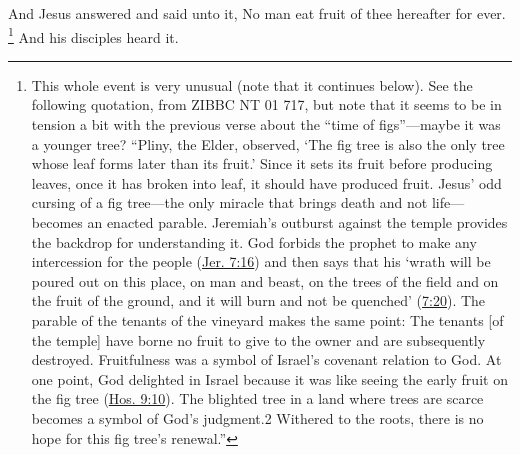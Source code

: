 			And Jesus answered and said unto it, No man eat fruit of thee hereafter for ever.%
				\footnote{%
					This whole event is very unusual (note that it continues below). See the following quotation, from ZIBBC NT 01 717, but note that it seems to be in tension a bit with the previous verse about the ``time of figs''---maybe it was a younger tree? ``Pliny, the Elder, observed, `The fig tree is also the only tree whose leaf forms later than its fruit.' Since it sets its fruit before producing leaves, once it has broken into leaf, it should have produced fruit. Jesus' odd cursing of a fig tree---the only miracle that brings death and not life---becomes an enacted parable. Jeremiah's outburst against the temple provides the backdrop for understanding it. God forbids the prophet to make any intercession for the people (\hyperref[JEREMIAH-7-16]{Jer. 7:16}) and then says that his `wrath will be poured out on this place, on man and beast, on the trees of the field and on the fruit of the ground, and it will burn and not be quenched' (\hyperref[JEREMIAH-7-20]{7:20}). The parable of the tenants of the vineyard makes the same point: The tenants [of the temple] have borne no fruit to give to the owner and are subsequently destroyed. Fruitfulness was a symbol of Israel's covenant relation to God. At one point, God delighted in Israel because it was like seeing the early fruit on the fig tree (\hyperref[HOSEA-9-10]{Hos. 9:10}). The blighted tree in a land where trees are scarce becomes a symbol of God's judgment.2 Withered to the roots, there is no hope for this fig tree's renewal.''
					}
			And his disciples heard it.

			\begin{framed}
			\scriptsize
				\begin{compactdesc}
					\item[SBLG] 
				\end{compactdesc}
			\end{framed}

